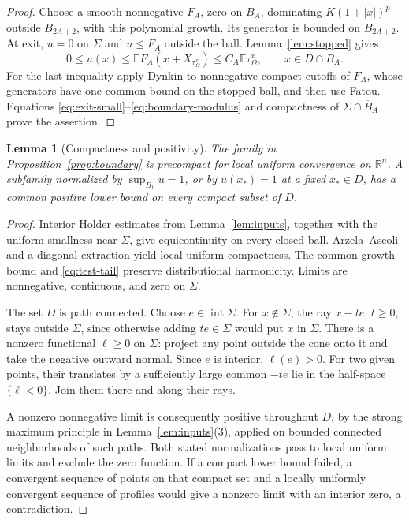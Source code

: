 \documentclass[11pt]{article}
\newtheorem{lemma}[theorem]{Lemma}
\numberwithin{equation}{section}
\newcommand{\R}{\mathbb R}
\newcommand{\E}{\mathbb E}
\begin{document}
\begin{proof}
Choose a smooth nonnegative \(F_A\), zero on \(B_A\), dominating
\(K(1+|x|)^p\) outside \(B_{2A+2}\), with this polynomial growth.
Its generator is bounded on \(B_{2A+2}\). At exit, \(u=0\) on \(\Sigma\)
and \(u\le F_A\) outside the ball. Lemma~\ref{lem:stopped} gives
\begin{equation}\label{eq:boundary-modulus}
 0\le u(x)\le\E F_A(x+X_{\tau_\Omega^x})
       \le C_A\E\tau_\Omega^x,\qquad x\in D\cap B_A.
\end{equation}
For the last inequality apply Dynkin to nonnegative compact cutoffs of
\(F_A\), whose generators have one common bound on the stopped ball,
and then use Fatou. Equations \eqref{eq:exit-small}--\eqref{eq:boundary-modulus}
and compactness of \(\Sigma\cap\overline B_A\) prove the assertion.
\end{proof}

\begin{lemma}[Compactness and positivity]\label{lem:compact}
The family in Proposition~\ref{prop:boundary} is precompact for local uniform
convergence on \(\R^n\). A subfamily normalized by \(\sup_{B_1}u=1\), or
by \(u(x_*)=1\) at a fixed \(x_*\in D\), has a common positive lower bound
on every compact subset of \(D\).
\end{lemma}

\begin{proof}
Interior Holder estimates from Lemma~\ref{lem:inputs}, together with the
uniform smallness near \(\Sigma\), give equicontinuity on every closed ball.
Arzela--Ascoli and a diagonal extraction yield local uniform compactness.
The common growth bound and \eqref{eq:test-tail} preserve distributional
harmonicity. Limits are nonnegative, continuous, and zero on \(\Sigma\).

The set \(D\) is path connected. Choose \(e\in\operatorname{int}\Sigma\).
For \(x\notin\Sigma\), the ray \(x-te\), \(t\ge0\), stays outside
\(\Sigma\), since otherwise adding \(te\in\Sigma\) would put \(x\) in
\(\Sigma\). There is a nonzero functional \(\ell\ge0\) on \(\Sigma\):
project any point outside the cone onto it and take the negative outward
normal. Since \(e\) is interior, \(\ell(e)>0\). For two given points,
their translates by a sufficiently large common \(-te\) lie in the
half-space \(\{\ell<0\}\). Join them there and along their rays.

A nonzero nonnegative limit is consequently positive throughout \(D\),
by the strong maximum principle in Lemma~\ref{lem:inputs}(3), applied on
bounded connected neighborhoods of such paths. Both stated normalizations
pass to local uniform limits and exclude the zero function. If a compact
lower bound failed, a convergent sequence of points on that compact set
and a locally uniformly convergent sequence of profiles would give a
nonzero limit with an interior zero, a contradiction.
\end{proof}
\end{document}
